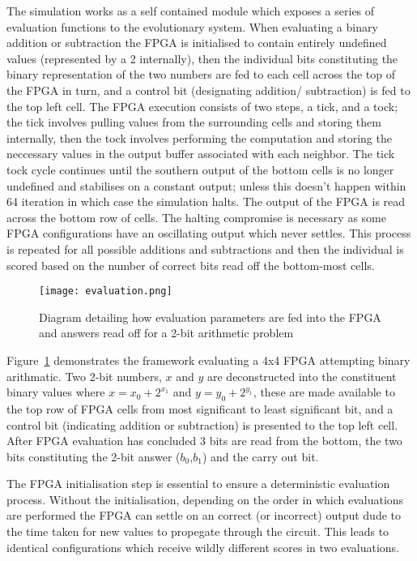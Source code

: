 The simulation works as a self contained module which exposes a series of
evaluation functions to the evolutionary system. When evaluating a binary
addition or subtraction the FPGA is initialised to contain entirely undefined
values (represented by a 2 internally), then the individual bits constituting the binary representation of the two numbers are fed
to each cell across the top of the FPGA in turn, and a control bit (designating addition/
subtraction) is fed to the top left cell. The FPGA execution consists of
two steps, a tick, and a tock; the tick involves pulling values from the surrounding
cells and storing them internally, then the tock involves performing the computation
and storing the neccessary values in the output buffer associated with each neighbor.
The tick tock
cycle continues until the southern output of the bottom cells is no longer undefined
and stabilises on a constant output; unless this doesn't happen within 64 iteration
in which case the simulation halts.
The output of the FPGA is read across the bottom row of cells.
The halting compromise is necessary as some FPGA configurations
have an oscillating output which never settles. This process is repeated for all possible
additions and subtractions and then the individual is scored based on the number
of correct bits read off the bottom-most cells.

\begin{figure}
\centering
\texttt{[image: evaluation.png]}
\caption{Diagram detailing how evaluation parameters are fed into the FPGA and answers
read off for a 2-bit arithmetic problem}
\label{fig:control}
\end{figure}

Figure~\ref{fig:control} demonstrates the framework evaluating a 4x4 FPGA attempting
binary arithmatic. Two 2-bit numbers, $x$ and $y$ are deconstructed into the constituent
binary values where $x = x_0 + 2^{x_1}$ and $y = y_0 + 2^{y_1}$, these are made available
to the top row of FPGA cells from most significant to least significant bit, and a
control bit (indicating addition or subtraction) is presented to the top left cell.
After FPGA evaluation has concluded 3 bits are read from the bottom, the two bits
constituting the 2-bit answer ($b_0$,$b_1$) and the carry out bit.

The FPGA initialisation step is essential to ensure a deterministic evaluation
process. Without the initialisation, depending on the order in which evaluations
are performed the FPGA can settle on an correct (or incorrect) output dude to the
time taken for new values to propegate through the circuit. This leads to identical
configurations which receive wildly different scores in two evaluations.

